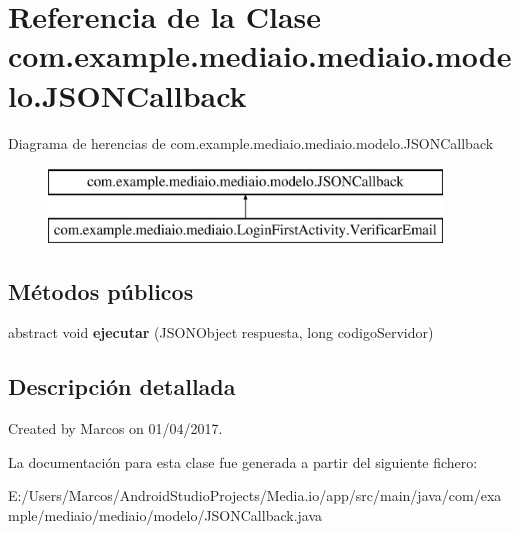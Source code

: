 \hypertarget{classcom_1_1example_1_1mediaio_1_1mediaio_1_1modelo_1_1_j_s_o_n_callback}{}\section{Referencia de la Clase com.\+example.\+mediaio.\+mediaio.\+modelo.\+J\+S\+O\+N\+Callback}
\label{classcom_1_1example_1_1mediaio_1_1mediaio_1_1modelo_1_1_j_s_o_n_callback}
Diagrama de herencias de com.\+example.\+mediaio.\+mediaio.\+modelo.\+J\+S\+O\+N\+Callback\begin{figure}[H]
\begin{center}
\leavevmode
\includegraphics[height=2.000000cm]{classcom_1_1example_1_1mediaio_1_1mediaio_1_1modelo_1_1_j_s_o_n_callback}
\end{center}
\end{figure}
\subsection*{Métodos públicos}
\begin{DoxyCompactItemize}
\item 
\mbox{\label{classcom_1_1example_1_1mediaio_1_1mediaio_1_1modelo_1_1_j_s_o_n_callback_a3058429efea086b6579aaec145619ed4}} 
abstract void {\bfseries ejecutar} (J\+S\+O\+N\+Object respuesta, long codigo\+Servidor)
\end{DoxyCompactItemize}


\subsection{Descripción detallada}
Created by Marcos on 01/04/2017. 

La documentación para esta clase fue generada a partir del siguiente fichero\+:\begin{DoxyCompactItemize}
\item 
E\+:/\+Users/\+Marcos/\+Android\+Studio\+Projects/\+Media.\+io/app/src/main/java/com/example/mediaio/mediaio/modelo/J\+S\+O\+N\+Callback.\+java\end{DoxyCompactItemize}
